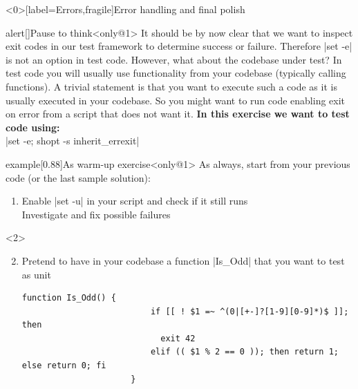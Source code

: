 \begin{frame}<0>[label=Errors,fragile]{Error handling and final polish}
    \vspace{-2mm}
    \begin{varblock}{alert}[\textwidth]{Pause to think}<only@1>
        It should be by now clear that we want to inspect exit codes in our test framework to determine success or failure.
        Therefore \bash|set -e| is not an option in test code.
        However, what about the codebase under test?
        In test code you will usually use functionality from your codebase (typically calling functions).
        A trivial statement is that you want to execute such a code as it is usually executed in your codebase.
        So you might want to run code enabling exit on error from a script that does not want it.
        \textbf{In this exercise we want to test code using:}\\
        \bash|set -e; shopt -s inherit_errexit|
    \end{varblock}
    \begin{varblock*}{example}[0.88\textwidth]{As warm-up exercise}<only@1>
        As always, start from your previous code (or the last sample solution):
        \begin{enumerate}
            \item Enable \bash|set -u| in your script and check if it still runs\\
                  \then Investigate and fix possible failures
        \end{enumerate}
    \end{varblock*}
    \begin{onlyenv}<2>
        \begin{enumerate}
            \setcounter{enumi}{1}
            \item Pretend to have in your codebase a function \bash|Is_Odd| that you want to test as unit
                  \begin{lstlisting}[style=MyBash, numbers=none, aboveskip=3mm, belowskip=-5mm, style=smaller, xleftmargin=2mm, xrightmargin=10mm]
                      function Is_Odd() {
                          if [[ ! $1 =~ ^(0|[+-]?[1-9][0-9]*)$ ]]; then
                            exit 42
                          elif (( $1 % 2 == 0 )); then return 1; else return 0; fi
                      }
                  \end{lstlisting}


\end{enumerate}
\end{onlyenv}
\end{frame}
